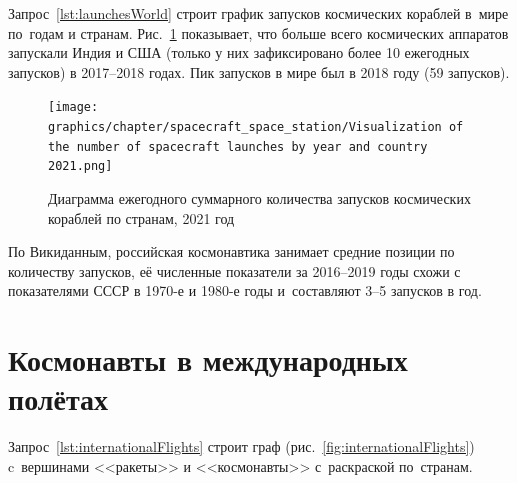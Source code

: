 Запрос~\ref{lst:launchesWorld} строит график 
запусков космических кораблей в~мире по~годам и странам. 
Рис.~\ref{fig:launchesWorld} показывает, что больше всего космических аппаратов 
запускали Индия и США 
(только у них зафиксировано более 10 ежегодных запусков) в 2017--2018 годах. 
Пик запусков в мире был в 2018 году (59 запусков). 




\newpage

\begin{figure}[h!]
  \texttt{[image: graphics/chapter/spacecraft\_space\_station/Visualization of the number of spacecraft launches by year and country 2021.png]}
  \caption[График запусков космических кораблей в мире по годам и странам, 2021 год.]
    {Диаграмма ежегодного суммарного количества запусков космических кораблей по странам, 2021 год}
  \label{fig:launchesWorld}%
\end{figure}


\newpage

По Викиданным, российская космонавтика занимает средние позиции по количеству запусков, 
её численные показатели за 2016--2019 годы схожи с показателями СССР в 1970-е и 1980-е годы 
и~составляют 3--5 запусков в год.





\section{Космонавты в международных полётах}

Запрос~\ref{lst:internationalFlights} строит граф (рис.~\ref{fig:internationalFlights}) 
c~вершинами <<ракеты>> и <<космонавты>> с~раскраской по~странам.

